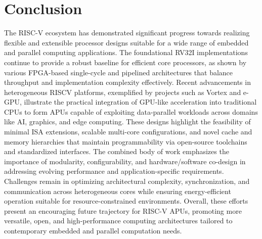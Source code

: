 \documentclass[conference]{IEEEtran}
\begin{document}
\section{Conclusion}
The RISC-V ecosystem has demonstrated significant progress towards realizing flexible and extensible processor designs suitable for a wide range of embedded and parallel computing applications. The foundational RV32I implementations continue to provide a robust baseline for efficient core processors, as shown by various FPGA-based single-cycle and pipelined architectures that balance throughput and implementation complexity effectively. Recent advancements in heterogeneous RISCV platforms, exemplified by projects such as Vortex and e-GPU, illustrate the practical integration of GPU-like acceleration into traditional CPUs to form APUs capable of exploiting data-parallel workloads across domains like AI, graphics, and edge computing. These designs highlight the feasibility of minimal ISA extensions, scalable multi-core configurations, and novel cache and memory hierarchies that maintain programmability via open-source toolchains and standardized interfaces. The combined body of work emphasizes the importance of modularity, configurability, and hardware/software co-design in addressing evolving performance and application-specific requirements. Challenges remain in optimizing architectural complexity, synchronization, and communication across heterogeneous cores while ensuring energy-efficient operation suitable for resource-constrained environments. Overall, these efforts present an encouraging future trajectory for RISC-V APUs, promoting more versatile, open, and high-performance computing architectures tailored to contemporary embedded and parallel computation needs.
\end{document}
